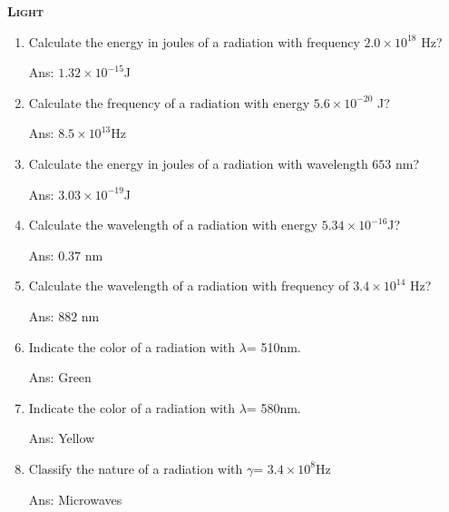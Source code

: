 \documentclass[main.tex]{subfiles}
\begin{document}
\newpage
\setdoublesep{0.35700 em}  %
\setatomsep{1.78500 em}    %
\setbondoffset{0.18265 em} %
\newcommand{\bondwidth}{0.06642 em} %
\setbondstyle{line width = \bondwidth}
\fancyhfoffset[E,O]{0pt}
\setlength{\columnsep}{30pt}
\begin{conclusion}
\end{conclusion}
\begin{multicols*}{2}

{\raggedright\textsc{\textbf{Light }}\par}
\begin{enumerate}

\item Calculate the energy in joules of a radiation with frequency $2.0\times10^{18}$ Hz?
\begin{flushright}\small Ans: $1.32\times10^{-15}$J\end{flushright}

\item Calculate the frequency of a radiation with energy $5.6\times10^{-20}$ J?
\begin{flushright}\small Ans: $8.5\times10^{13}$Hz\end{flushright}

\item Calculate the energy in joules of a radiation with wavelength $653$ nm?
\begin{flushright}\small Ans: $3.03\times10^{-19}$J\end{flushright}

\item Calculate the wavelength of a radiation with  energy $5.34\times10^{-16}$J?
\begin{flushright}\small Ans: $0.37$ nm\end{flushright}

\item Calculate the wavelength of a radiation with  frequency of $3.4\times10^{14}$ Hz?
\begin{flushright}\small Ans: $882$ nm\end{flushright}

\item Indicate the color of a radiation with $\lambda$= 510nm.
\begin{flushright}\small Ans: Green\end{flushright}

\item Indicate the color of a radiation with $\lambda$= 580nm.
\begin{flushright}\small Ans: Yellow\end{flushright}
\item Classify the nature of a radiation with $\gamma$= $3.4\times10^{8}$Hz
\begin{flushright}\small Ans: Microwaves\end{flushright}




\end{enumerate}
\end{multicols*}
\end{document}
